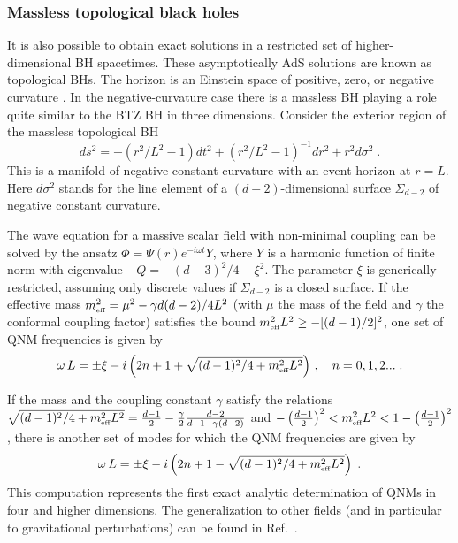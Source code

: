 \documentclass[]{iopart}
\def\be{\begin{equation}}
\def\ee{\end{equation}}
\def\f{\frac}
\def\f{\frac}
\begin{document}
\subsubsection*{Massless topological black holes}

It is also possible to obtain exact solutions in a restricted set of
higher-dimensional BH spacetimes. These asymptotically AdS solutions are known
as topological BHs. The horizon is an Einstein space of positive, zero, or
negative curvature
\cite{Lemos:1994fn,Lemos:1994xp,Lemos:1995cm,Mann:1996gj,Vanzo:1997gw,Birmingham:1998nr}.
In the negative-curvature case there is a massless BH playing a role quite
similar to the BTZ BH in three dimensions. Consider the exterior region of the
massless topological BH \cite{Aros:2002te}
\[
ds^{2}=-\left(r^{2}/L^{2}-1\right)
dt^{2}+\left(r^{2}/L^{2}-1\right)^{-1}dr^{2}
+r^{2}d\sigma ^{2}\;.
\]
This is a manifold of negative constant curvature with an event horizon at
$r=L$. Here $d\sigma^{2}$ stands for the line element of a
$(d-2)$-dimensional surface $\Sigma _{d-2}$ of negative constant curvature.

The wave equation for a massive scalar field with non-minimal coupling can be
solved by the ansatz $\Phi=\Psi(r)e^{-i\omega t}Y$, where $Y$ is a harmonic
function of finite norm with eigenvalue $-Q=-\left(d-3\right)^{2}/4-\xi
^{2}$. The parameter $\xi $ is generically restricted, assuming only discrete
values if $\Sigma _{d-2}$ is a closed surface. If the effective mass
$m_{\textrm{{\tiny{eff}}}}^{2}=\mu^{2}-\gamma d(d-2)/4L^{2}$ (with $\mu$ the
mass of the field and $\gamma$ the conformal coupling factor) satisfies the
bound $m_{\textrm{\tiny{eff}}}^{2}L^{2}\geq -[(d-1)/2]^{2}$, one set of QNM
frequencies is given by \cite{Aros:2002te}
%
\be \omega \,L=\pm \xi -i\left(2n+1+\sqrt{(d-1)^{2}/4+m_{\textrm{{\tiny{eff}}}}^{2}L^{2}}\right) \,,\quad n=0,1,2...\;. \label{omegamas} \ee
%

If the mass and the coupling constant $\gamma $ satisfy the relations
%
$\sqrt{(d-1)^{2}/4+m_{\textrm{{\tiny{eff}}}}^{2}L^{2}}= \f{d-1}{2}-
\frac{\gamma}{2}\frac{d-2}{d-1-\gamma (d-2)}$ and
%
$ -\left( \frac{d-1}{2}\right) ^{2}<m_{\textrm{{\tiny{eff}}}}^{2}L^{2}<1-\left( \frac{d-1}{2}\right) ^{2}$,
%
there is another set of modes for which the QNM frequencies are given by
\cite{Aros:2002te}
%
\be \omega \,L=\pm \xi -i\left( 2n+1-\sqrt{(d-1)^{2}/4+m_{ \textrm{{\tiny{eff}}}}^{2}L^{2}}\right) \;. \label{omegamenos} \ee
%
This computation represents the first exact analytic determination of QNMs in
four and higher dimensions. The generalization to other fields (and in
particular to gravitational perturbations) can be found in
Ref.~\cite{Birmingham:2006zx}.
\end{document}
